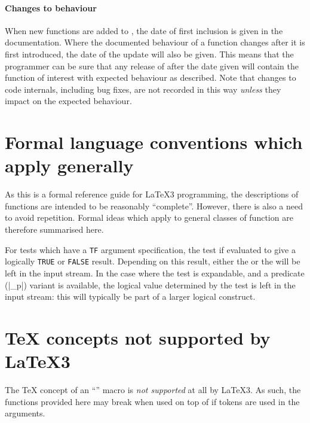 \documentclass[uplatex,dvipdfmx,full,kernel]{wtpl3doc}
\begin{document}
\paragraph{Changes to behaviour}
When new functions are added to , the date of first inclusion is
given in the documentation. Where the documented behaviour of a function
changes after it is first introduced, the date of the update will also be
given. This means that the programmer can be sure that any release of
 after the date given will contain the function of interest with
expected behaviour as described. Note that changes to code internals, including
bug fixes, are not recorded in this way \emph{unless} they impact on the
expected behaviour.

\section{Formal language conventions which apply generally}

As this is a formal reference guide for \LaTeX3 programming, the descriptions
of functions are intended to be reasonably \enquote{complete}. However, there
is also a need to avoid repetition. Formal ideas which apply to general
classes of function are therefore summarised here.

For tests which have a \texttt{TF} argument specification, the test if
evaluated to give a logically \texttt{TRUE} or \texttt{FALSE} result.
Depending on this result, either the  or the 
will be left in the input stream. In the case where the test is expandable,
and a predicate (|_p|) variant is available, the logical value determined by
the test is left in the input stream: this will typically be part of a larger
logical construct.

\section{\TeX{} concepts not supported by \LaTeX3{}}

The \TeX{} concept of an \enquote{} macro is \emph{not supported}
at all by \LaTeX3{}. As such, the functions provided here may break when
used on top of \LaTeXe{} if  tokens are used in the arguments.
\end{document}
